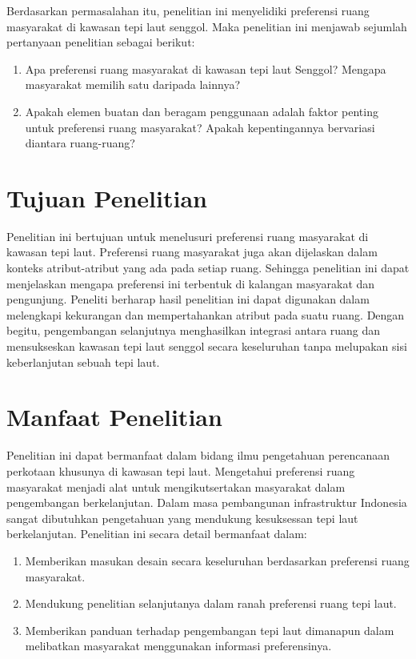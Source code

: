 \documentclass[12pt,oneside]{udthesis}
\begin{document}
Berdasarkan permasalahan itu, penelitian ini menyelidiki preferensi ruang masyarakat di kawasan tepi laut senggol. Maka penelitian ini menjawab sejumlah pertanyaan penelitian sebagai berikut:

\begin{enumerate}
\item Apa preferensi ruang masyarakat di kawasan tepi laut Senggol? Mengapa masyarakat memilih satu daripada lainnya?
    \item Apakah elemen buatan dan beragam penggunaan adalah faktor penting untuk preferensi ruang masyarakat? Apakah kepentingannya bervariasi diantara ruang-ruang?
\end{enumerate}


\section{Tujuan Penelitian}
Penelitian ini bertujuan untuk menelusuri preferensi ruang  masyarakat di kawasan tepi laut. Preferensi ruang masyarakat juga akan dijelaskan dalam konteks atribut-atribut yang ada pada setiap ruang. Sehingga penelitian ini dapat menjelaskan mengapa preferensi ini terbentuk di kalangan masyarakat dan pengunjung.
Peneliti berharap hasil penelitian ini dapat digunakan dalam melengkapi kekurangan dan mempertahankan atribut pada suatu ruang. Dengan begitu, pengembangan selanjutnya menghasilkan integrasi antara ruang dan mensukseskan kawasan tepi laut senggol secara keseluruhan tanpa melupakan sisi keberlanjutan sebuah tepi laut.

\section{Manfaat Penelitian}

Penelitian ini dapat bermanfaat dalam bidang ilmu pengetahuan perencanaan perkotaan khusunya di kawasan tepi laut. Mengetahui preferensi ruang masyarakat menjadi alat untuk mengikutsertakan masyarakat dalam pengembangan berkelanjutan. Dalam masa pembangunan infrastruktur Indonesia sangat dibutuhkan pengetahuan yang mendukung kesuksessan tepi laut berkelanjutan. Penelitian ini secara detail bermanfaat dalam:

\begin{enumerate}
\item Memberikan masukan desain secara keseluruhan berdasarkan preferensi ruang masyarakat.
\item Mendukung penelitian selanjutanya dalam ranah preferensi ruang tepi laut.
\item Memberikan panduan terhadap pengembangan tepi laut dimanapun dalam melibatkan masyarakat menggunakan informasi preferensinya.
\end{enumerate}
\end{document}
